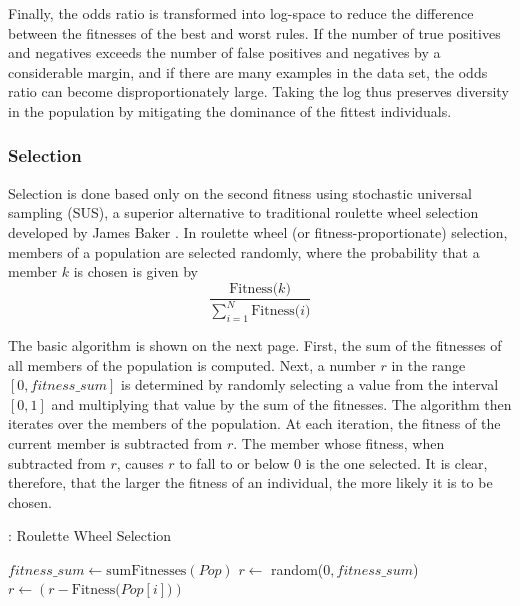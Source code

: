 \documentclass[11pt]{article}
\begin{document}
Finally, the odds ratio is transformed into log-space to reduce the difference between the fitnesses of the best and worst rules. If the number of true positives and negatives exceeds the number of false positives and negatives by a considerable margin, and if there are many examples in the data set, the odds ratio can become disproportionately large. Taking the log thus preserves diversity in the population by mitigating the dominance of the fittest individuals.

\subsubsection{Selection}

Selection is done based only on the second fitness using stochastic universal sampling (SUS), a superior alternative to traditional roulette wheel selection developed by James Baker \cite{j_reducing_1987}. In roulette wheel (or fitness-proportionate) selection, members of a population are selected randomly, where the probability that a member $k$ is chosen is given by
$$ \frac{\text{Fitness($k$)}}{\sum_{i=1}^N\text{Fitness($i$)}}$$

The basic algorithm is shown on the next page. First, the sum of the fitnesses of all members of the population is computed. Next, a number $r$ in the range $[0, fitness\_sum]$ is determined by randomly selecting a value from the interval $[0,1]$ and multiplying that value by the sum of the fitnesses. The algorithm then iterates over the members of the population. At each iteration, the fitness of the current member is subtracted from $r$. The member whose fitness, when subtracted from $r$, causes $r$ to fall to or below 0 is the one selected. It is clear, therefore, that the larger the fitness of an individual, the more likely it is to be chosen.

\begin{algorithm}
\caption{: Roulette Wheel Selection}
\label{rws}
\begin{algorithmic}
\State $fitness\_sum \gets \text{sumFitnesses}(Pop)$
\State $r \gets$ random($0,fitness\_sum$)
\State $r \gets (r - \text{Fitness($Pop[i]$)})$
\State {}
\EndIf
\EndFor
\State {}
\EndFunction
\end{algorithmic}
\end{algorithm}
\end{document}
